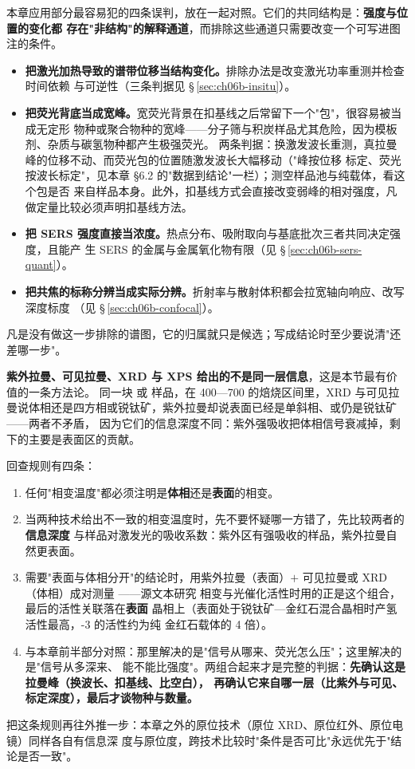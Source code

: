 \begin{pitfall}
本章应用部分最容易犯的四条误判，放在一起对照。它们的共同结构是：\textbf{强度与位置的变化都
存在"非结构"的解释通道}，而排除这些通道只需要改变一个可写进图注的条件。

\begin{itemize}
\item \textbf{把激光加热导致的谱带位移当结构变化。}排除办法是改变激光功率重测并检查时间依赖
  与可逆性（三条判据见 \S\,\ref{sec:ch06b-insitu}）。
\item \textbf{把荧光背底当成宽峰。}宽荧光背景在扣基线之后常留下一个"包"，很容易被当成无定形
  物种或聚合物种的宽峰——分子筛与积炭样品尤其危险，因为模板剂、杂质与碳氢物种都产生极强荧光。
  两条判据：换激发波长重测，真拉曼峰的位移不动、而荧光包的位置随激发波长大幅移动（"峰按位移
  标定、荧光按波长标定"，见本章 §6.2 的"数据到结论"一栏）；测空样品池与纯载体，看这个包是否
  来自样品本身。此外，扣基线方式会直接改变弱峰的相对强度，凡做定量比较必须声明扣基线方法。
\item \textbf{把 SERS 强度直接当浓度。}热点分布、吸附取向与基底批次三者共同决定强度，且能产
  生 SERS 的金属与金属氧化物有限（见 \S\,\ref{sec:ch06b-sers-quant}）。
\item \textbf{把共焦的标称分辨当成实际分辨。}折射率与散射体积都会拉宽轴向响应、改写深度标度
  （见 \S\,\ref{sec:ch06b-confocal}）。
\end{itemize}
凡是没有做这一步排除的谱图，它的归属就只是候选；写成结论时至少要说清"还差哪一步"。
\end{pitfall}

\begin{crosscheck}
\textbf{紫外拉曼、可见拉曼、XRD 与 XPS 给出的不是同一层信息}，这是本节最有价值的一条方法论。
同一块  或  样品，在 \qty{400}{\degC}—\qty{700}{\degC} 的焙烧区间里，XRD
与可见拉曼说体相还是四方相或锐钛矿，紫外拉曼却说表面已经是单斜相、或仍是锐钛矿——两者不矛盾，
因为它们的信息深度不同：紫外强吸收把体相信号衰减掉，剩下的主要是表面区的贡献。

回查规则有四条：
\begin{enumerate}
\item 任何"相变温度"都必须注明是\textbf{体相}还是\textbf{表面}的相变。
\item 当两种技术给出不一致的相变温度时，先不要怀疑哪一方错了，先比较两者的\textbf{信息深度}
  与样品对激发光的吸收系数：紫外区有强吸收的样品，紫外拉曼自然更表面。
\item 需要"表面与体相分开"的结论时，用紫外拉曼（表面）$+$ 可见拉曼或 XRD（体相）成对测量
  ——源文本研究  相变与光催化活性时用的正是这个组合，最后的活性关联落在\textbf{表面}
  晶相上（表面处于锐钛矿—金红石混合晶相时产氢活性最高，-3 的活性约为纯
  金红石载体的 4 倍）。
\item 与本章前半部分对照：那里解决的是"信号从哪来、荧光怎么压"；这里解决的是"信号从多深来、
  能不能比强度"。两组合起来才是完整的判据：\textbf{先确认这是拉曼峰（换波长、扣基线、比空白），
  再确认它来自哪一层（比紫外与可见、标定深度），最后才谈物种与数量。}
\end{enumerate}
把这条规则再往外推一步：本章之外的原位技术（原位 XRD、原位红外、原位电镜）同样各自有信息深
度与原位度，跨技术比较时"条件是否可比"永远优先于"结论是否一致"。
\end{crosscheck}

